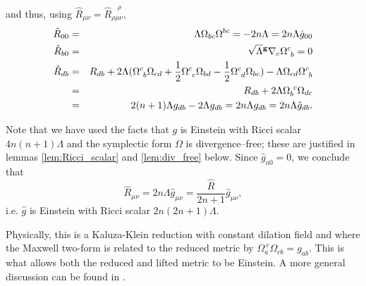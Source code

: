 and thus, using $\hat{R}_{\mu\nu}=\hat{R}_{\rho\mu\nu}^{\ \ \ \ \rho}$,
\begin{eqnarray*}
\hat{R}_{00} & = & \Lambda\Omega_{bc}\Omega^{bc}=-2n\Lambda=2n\Lambda\hat{g}_{00}\\
\hat{R}_{b0} & = & \sqrt{\Lambda}{^{\bf g}\nabla}_{c}\Omega_{\ b}^{c}=0\\
\hat{R}_{db} & = & R_{db}+2\Lambda(\Omega_{\ b}^{c}\Omega_{cd}+\frac{1}{2}\Omega_{\ c}^{c}\Omega_{bd}-\frac{1}{2}\Omega_{\ d}^{c}\Omega_{bc})-\Lambda\Omega_{cd}\Omega_{\ b}^{c}\\
 & = & R_{db}+2\Lambda\Omega_{b}^{\ c}\Omega_{dc}\\
 & = & 2(n+1)\Lambda g_{db}-2\Lambda g_{db}=2n\Lambda g_{db}=2n\Lambda\hat{g}_{db}.
\end{eqnarray*}


Note that we have used the facts that $g$ is Einstein with Ricci
scalar $4n(n+1)\Lambda$ and the symplectic form $\Omega$ is divergence--free;
these are justified in lemmas \ref{lem:Ricci_scalar} and \ref{lem:div_free} below. Since $\hat{g}_{a0}=0$,
we conclude that
\[
\hat{R}_{\mu\nu}=2n\Lambda\hat{g}_{\mu\nu}=\frac{\hat{R}}{2n+1}\hat{g}_{\mu\nu},
\]
i.e. $\hat{g}$ is Einstein with Ricci scalar $2n(2n+1)\Lambda$.
\koniec

Physically, this is a Kaluza-Klein reduction with constant dilation
field and where the Maxwell two-form is related to the reduced metric
by $\Omega_{a}^{\ c}\Omega_{cb}=g_{ab}$. This is what allows both
the reduced and lifted metric to be Einstein. A more general discussion
can be found in \cite{Pope}.

